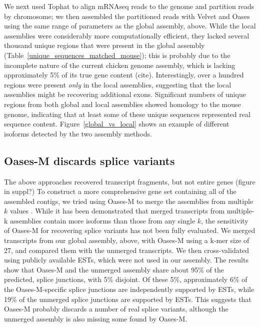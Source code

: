 \documentclass[10pt]{article}
\begin{document}
We next used Tophat to align mRNAseq reads to the genome and partition
reads by chromosome; we then assembled the partitioned reads with
Velvet and Oases using the same range of parameters as the global
assembly, above.  While the local assemblies were considerably more
computationally efficient, they lacked several thousand unique regions
that were present in the global assembly
(Table~\ref{unique_sequences_matched_mouse}); this is probably due to
the incomplete nature of the current chicken genome assembly, which is
lacking approximately 5\% of its true gene content (cite).
Interestingly, over a hundred regions were present {\em only} in the
local assemblies, suggesting that the local assemblies might be
recovering additional exons.  Significant numbers of unique regions
from both global and local assemblies showed homology to the mouse
genome, indicating that at least some of these unique sequences
represented real sequence content.  Figure~\ref{global_vs_local} shows
an example of different isoforms detected by the two assembly methods.



\subsection*{Oases-M discards splice variants}

The above approaches recovered transcript fragments, but not entire genes
(figure in suppl?)
To construct a more comprehensive gene set containing all of the
assembled contigs, we tried using Oases-M to merge the assemblies from
multiple $k$ values \cite{Schulz:2012je}.  While it has been
demonstrated that merged transcripts from multiple-k assemblies
contain more isoforms than those from any single $k$, the sensitivity
of Oases-M for recovering splice variants has not been fully
evaluated.
We merged transcripts from our global assembly, above,
with Oases-M using a k-mer size of 27, and compared them with the
unmerged transcripts.  We then cross-validated using publicly
available ESTs, which were not used in our assembly.
The results show that
Oases-M and the unmerged assembly share about 95\% of the predicted,
splice junctions, with 5\% disjoint.  Of these 5\%,
approximately 6\% of the Oases-M-specific splice junctions are
independently supported by ESTs, while 19\% of the unmerged splice
junctions are supported by ESTs.
This suggests that Oases-M probably
discards a number of real splice variants, although the unmerged
assembly is also missing some found by Oases-M.
\end{document}
